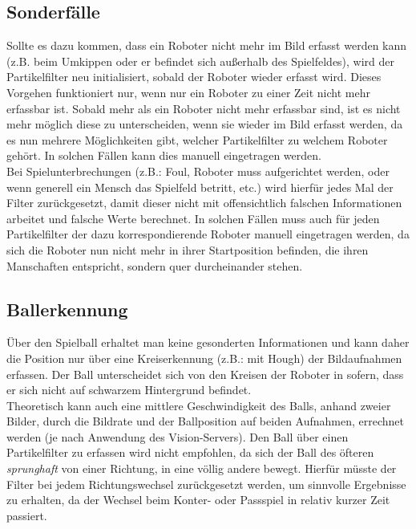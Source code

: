 \documentclass{ezb}
\begin{document}
\subsection{Sonderfälle}
Sollte es dazu kommen, dass ein Roboter nicht mehr im Bild erfasst werden kann (z.B. beim Umkippen oder er befindet sich außerhalb des Spielfeldes), wird der Partikelfilter neu initialisiert, sobald der Roboter wieder erfasst wird. Dieses Vorgehen funktioniert nur, wenn nur ein Roboter zu einer Zeit nicht mehr erfassbar ist. Sobald mehr als ein Roboter nicht mehr erfassbar sind, ist es nicht mehr möglich diese zu unterscheiden, wenn sie wieder im Bild erfasst werden, da es nun mehrere Möglichkeiten gibt, welcher Partikelfilter zu welchem Roboter gehört. In solchen Fällen kann dies manuell eingetragen werden.\\
\linebreak
{}
Bei Spielunterbrechungen (z.B.: Foul, Roboter muss aufgerichtet werden, oder wenn generell ein Mensch das Spielfeld betritt, etc.)  wird hierfür jedes Mal der Filter zurückgesetzt, damit dieser nicht mit offensichtlich falschen Informationen arbeitet und falsche Werte berechnet. In solchen Fällen muss auch für jeden Partikelfilter der dazu korrespondierende Roboter manuell eingetragen werden, da sich die Roboter nun nicht mehr in ihrer Startposition befinden, die ihren Manschaften entspricht, sondern quer durcheinander stehen.
\subsection{Ballerkennung}
Über den Spielball erhaltet man keine gesonderten Informationen und kann daher die Position nur über eine Kreiserkennung (z.B.: mit Hough) der Bildaufnahmen erfassen. Der Ball unterscheidet sich von den Kreisen der Roboter in sofern, dass er sich nicht auf schwarzem Hintergrund befindet.\\
Theoretisch kann auch eine mittlere Geschwindigkeit des Balls, anhand zweier Bilder, durch die Bildrate und der Ballposition auf beiden Aufnahmen, errechnet werden (je nach Anwendung des Vision-Servers). Den Ball über einen Partikelfilter zu erfassen wird nicht empfohlen, da sich der Ball des öfteren \textit{sprunghaft} von einer Richtung, in eine völlig andere bewegt. Hierfür müsste der Filter bei jedem Richtungswechsel zurückgesetzt werden, um sinnvolle Ergebnisse zu erhalten, da der Wechsel beim Konter- oder Passspiel in relativ kurzer Zeit passiert.
\end{document}

